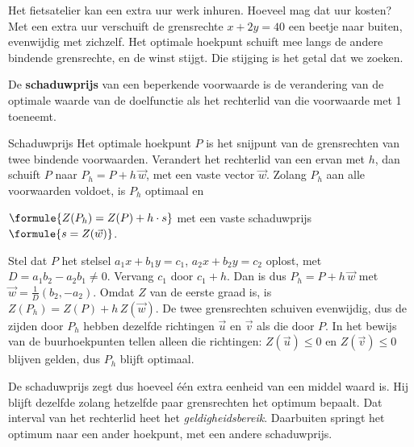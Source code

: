 Het fietsatelier kan een extra uur werk inhuren. Hoeveel mag dat uur kosten? Met een extra uur verschuift de grensrechte $x + 2y = 40$ een beetje naar buiten, evenwijdig met zichzelf. Het optimale hoekpunt schuift mee langs de andere bindende grensrechte, en de winst stijgt. Die stijging is het getal dat we zoeken.

\begin{theorie}
De \textbf{\textcolor{accent}{schaduwprijs}} van een beperkende voorwaarde is de verandering van de optimale waarde van de doelfunctie als het rechterlid van die voorwaarde met 1 toeneemt.

\begin{stelling}{Schaduwprijs}
Het optimale hoekpunt $P$ is het snijpunt van de grensrechten van twee bindende voorwaarden. Verandert het rechterlid van een ervan met $h$, dan schuift $P$ naar $P_h = P + h\,\vec w$, met een vaste vector $\vec w$. Zolang $P_h$ aan alle voorwaarden voldoet, is $P_h$ optimaal en

\vspace{1mm}
\qquad $\formule{Z(P_h) = Z(P) + h \cdot s}$ \qquad met een vaste schaduwprijs $\formule{s = Z(\vec w)}$.
\end{stelling}

\begin{bewijs}
Stel dat $P$ het stelsel $a_1x + b_1y = c_1$, $a_2x + b_2y = c_2$ oplost, met $D = a_1b_2 - a_2b_1 \neq 0$. Vervang $c_1$ door $c_1 + h$. Dan is
dus $P_h = P + h\,\vec w$ met $\vec w = \tfrac1D(b_2, -a_2)$. Omdat $Z$ van de eerste graad is, is $Z(P_h) = Z(P) + h\,Z(\vec w)$. De twee grensrechten schuiven evenwijdig, dus de zijden door $P_h$ hebben dezelfde richtingen $\vec u$ en $\vec v$ als die door $P$. In het bewijs van de buurhoekpunten tellen alleen die richtingen: $Z(\vec u) \leqslant 0$ en $Z(\vec v) \leqslant 0$ blijven gelden, dus $P_h$ blijft optimaal.
\end{bewijs}
\end{theorie}

De schaduwprijs zegt dus hoeveel één extra eenheid van een middel waard is. Hij blijft dezelfde zolang hetzelfde paar grensrechten het optimum bepaalt. Dat interval van het rechterlid heet het \emph{geldigheidsbereik}. Daarbuiten springt het optimum naar een ander hoekpunt, met een andere schaduwprijs.

